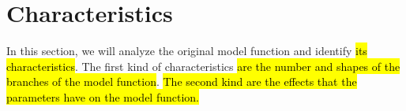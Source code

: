 \section{Characteristics}
\label{sec:setup.char}

In this section, we will analyze the original model function and identify \hl{its characteristics}.
The first kind of characteristics \hl{are the number and shapes of the branches of the model function}.
\hl{
	The second kind are the effects that the parameters have on the model function.
}



